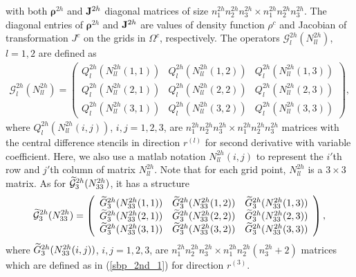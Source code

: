with both ${\bm \rho}^{2h}$ and ${\bf J}^{2h}$  diagonal matrices of size  $n_1^{2h}n_2^{2h}n_3^{2h}\times n_1^{2h}n_2^{2h}n_3^{2h}$. The diagonal entries of ${\bm \rho}^{2h}$ and ${\bf J}^{2h}$ are values of density function $\rho^c$ and Jacobian of transformation $J^c$ on the grids in $\Omega^c$, respectively.
The operators $\mathcal{G}_l^{2h}({N}_{ll}^{2h})$, $l=1,2$ are defined as
\begin{align}\label{g1122}
\mathcal{G}^{2h}_l({N}_{ll}^{2h}) = \left(\begin{array}{ccc}
Q_l^{2h}(N_{ll}^{2h}(1,1)) & Q_l^{2h}(N_{ll}^{2h}(1,2))  & Q_l^{2h}(N_{ll}^{2h}(1,3)) \\
Q_l^{2h}(N_{ll}^{2h}(2,1)) & Q_l^{2h}(N_{ll}^{2h}(2,2))  & Q_l^{2h}(N_{ll}^{2h}(2,3)) \\
Q_l^{2h}(N_{ll}^{2h}(3,1)) & Q_l^{2h}(N_{ll}^{2h}(3,2))  & Q_l^{2h}(N_{ll}^{2h}(3,3)) \end{array}\right),
\end{align}
where $Q_l^{2h}(N_{ll}^{2h}(i,j))$, $i,j = 1,2,3$, are $n_1^{2h}n_2^{2h}n_3^{2h}\times n_1^{2h}n_2^{2h}n_3^{2h}$ matrices with the central difference stencils in direction $r^{(l)}$ for second derivative with variable coefficient. Here, we also use a matlab notation $N_{ll}^{2h}(i,j)$ to represent the $i'$th row and $j'$th column of matrix $N_{ll}^{2h}$. Note that for each grid point, $N_{ll}^{2h}$ is a $3\times3$ matrix. As for $\widetilde{\mathcal{G}}_3^{2h}({N}_{33}^{2h})$, it has a structure
\[ \widetilde{\mathcal{G}}^{2h}_3({N}_{33}^{2h}) = \left(\begin{array}{ccc}
\widetilde{G}_3^{2h}(N_{33}^{2h}(1,1)) & \widetilde{G}_3^{2h}(N_{33}^{2h}(1,2))  & \widetilde{G}_3^{2h}(N_{33}^{2h}(1,3)) \\
\widetilde{G}_3^{2h}(N_{33}^{2h}(2,1)) & \widetilde{G}_3^{2h}(N_{33}^{2h}(2,2))  & \widetilde{G}_3^{2h}(N_{33}^{2h}(2,3)) \\
\widetilde{G}_3^{2h}(N_{33}^{2h}(3,1)) & \widetilde{G}_3^{2h}(N_{33}^{2h}(3,2))  & \widetilde{G}_3^{2h}(N_{33}^{2h}(3,3)) \end{array}\right),\]
where $\widetilde{G}_3^{2h}(N_{33}^{2h}(i,j))$, $i,j = 1,2,3$, are $n_1^{2h}n_2^{2h}n_3^{2h}\times n_1^{2h}n_2^{2h}(n_3^{2h}+2)$ matrices which are defined as in (\ref{sbp_2nd_1}) for direction $r^{(3)}$. 

